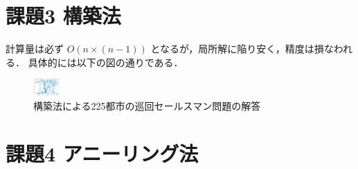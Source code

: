 \documentclass{jsarticle}
\begin{document}
\section{課題3 構築法}
計算量は必ず
$O(n \times (n - 1) )$
となるが，局所解に陥り安く，精度は損なわれる．
具体的には以下の図の通りである．


\begin{figure}[htb]
  \centering
    \includegraphics[width=1cm]{CM225.png}
	\caption{構築法による225都市の巡回セールスマン問題の解答}
\end{figure}

\section{課題4 アニーリング法}
\end{document}
